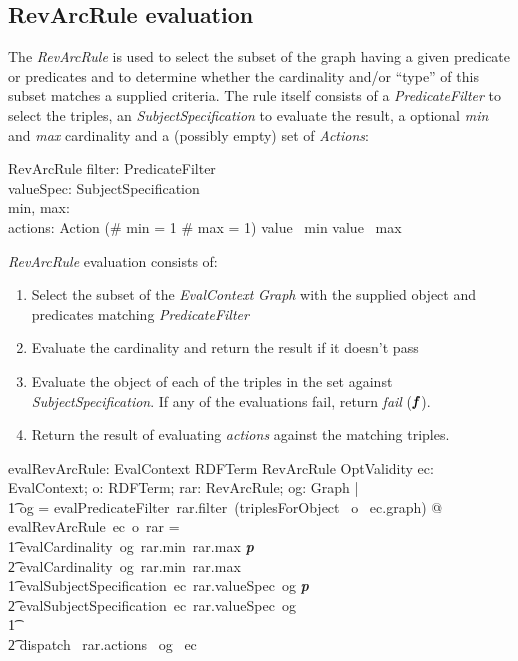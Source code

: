 \documentclass[fuzz]{llncs}
\def\pass{\textbf{\textit{p}}}
\def\fail{\textbf{\textit{f}}}
\def\zc{\textit}
\begin{document}
\subsection{RevArcRule evaluation}
The \zc{RevArcRule} is used to select the subset of the graph having a given predicate or
predicates and to determine whether the cardinality and/or ``type'' of this subset matches
a supplied criteria. The rule itself consists of a \zc{PredicateFilter} to select the triples,
 an \zc{SubjectSpecification} to evaluate the result, a optional \zc{min} and \zc{max}
 cardinality and a (possibly empty) set of \zc{Actions}:
\begin{schema}{RevArcRule}
   filter: PredicateFilter \\
   valueSpec: SubjectSpecification \\
   min, max: \optional[\nat] \\
   actions: \power Action
\where
   (\# min = 1 \land \# max = 1) \implies value~ min \leq value~ max
\end{schema}
\zc{RevArcRule} evaluation consists of:
\begin{enumerate}
\item Select the subset of the \zc{EvalContext} \zc{Graph} with the supplied object and predicates matching  \zc{PredicateFilter}
\item Evaluate the cardinality and return the result if it doesn't pass
\item Evaluate the object of each of the triples in the set against \zc{SubjectSpecification}.  If any of the evaluations fail, return \zc{fail} ($\fail$).
\item Return the result of evaluating \zc{actions} against the matching triples.
\end{enumerate}
\begin{gendef}
   evalRevArcRule: EvalContext \fun RDFTerm \fun RevArcRule \fun OptValidity
\where
   \forall ec: EvalContext; o: RDFTerm; rar: RevArcRule; og: Graph  | \\ 
\t1 og = evalPredicateFilter~rar.filter~(triplesForObject~ o~ ec.graph) @ \\
evalRevArcRule~ec~o~rar = \\
\t1 \IF evalCardinality~og~rar.min~rar.max \neq \pass \\
\t2 \THEN evalCardinality~og~rar.min~rar.max \\
\t1 \ELSE \IF evalSubjectSpecification~ec~rar.valueSpec~og \neq \pass \\
\t2 \THEN evalSubjectSpecification~ec~rar.valueSpec~og \\
\t1 \ELSE \\
\t2  dispatch~ rar.actions~ og~ ec 
\end{gendef}
\end{document}

